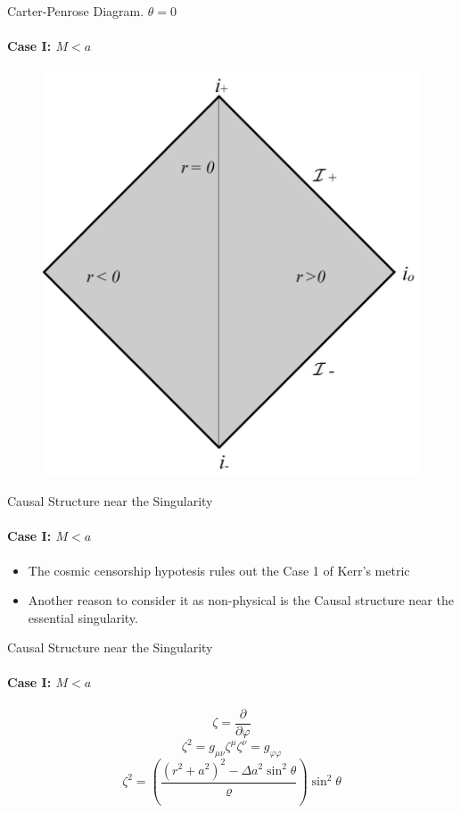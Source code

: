 \documentclass{beamer}
\begin{document}
      \begin{frame}{Carter-Penrose Diagram. $\theta=0$}
      \framesubtitle{Case I: $M<a$}
        	\begin{center}
				\begin{figure}
				\includegraphics[scale=0.75] {figures/fig37.jpg}
				\end{figure}
			\end{center}	
        \end{frame}
    
        \begin{frame}{Causal Structure near the Singularity}
         \framesubtitle{Case I: $M<a$}
			\begin{itemize}
			\item The cosmic censorship hypotesis rules out the Case 1 of Kerr's metric
            	\pause
             \item Another reason to consider it as non-physical is the Causal structure near the essential singularity.
			\end{itemize}
        \end{frame}
        
 		\begin{frame}{Causal Structure near the Singularity}
         \framesubtitle{Case I: $M<a$}
			$$\zeta=\frac{\partial}{\partial\varphi}$$
            \pause
            $$\zeta^{2}=g_{\mu\nu}\zeta^{\mu}\zeta^{\nu}=g_{\varphi\varphi}$$
            \pause
            $$\zeta^{2}=\left(\frac{\left(r^{2}+a^{2}\right)^{2}-\Delta a^{2}\sin^{2}\theta}{\varrho}\right)\sin^{2}\theta$$
        \end{frame}
        
\end{document}

